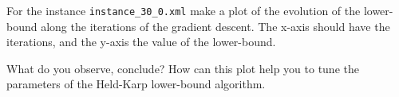 \documentclass[12pt]{report}
\newcommand{\answerbox}[2]{\hfill\break\\
        \framebox[\linewidth]{\parbox[c][#1][c]{\dimexpr\linewidth-2\fboxsep-2\fboxrule}{#2}}
}
\begin{document}
\pagebreak


\begin{Exercise}[title={Held and Karp lower-bound}]

\Question For the instance \verb|instance_30_0.xml| make a plot of the evolution of the lower-bound along the iterations of the gradient descent. The x-axis should have the iterations, and the y-axis the value of the lower-bound.
\answerbox{12cm}{
}


\Question What do you observe, conclude? How can this plot help you to tune the parameters of the Held-Karp lower-bound algorithm.
\answerbox{6cm}{
}


\end{Exercise}
\end{document}
